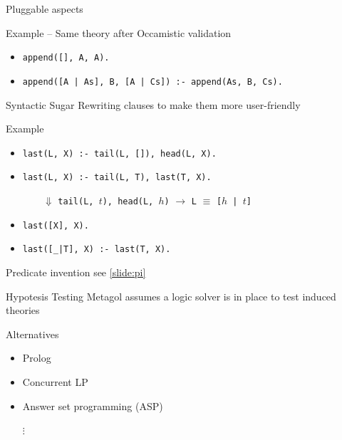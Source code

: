 \documentclass[presentation]{beamer}\mode<presentation>{\usetheme{AMSBolognaFC}}
\begin{document}
\begin{frame}[allowframebreaks]{Pluggable aspects}
    \begin{exampleblock}{Example -- Same theory after Occamistic validation}\scriptsize
        \begin{itemize}
            \item \texttt{append([], A, A).}
            \item \texttt{append([A | As], B, [A | Cs]) :- append(As, B, Cs).}
        \end{itemize}
    \end{exampleblock}

    \framebreak

    \begin{block}{Syntactic Sugar}
        Rewriting clauses to make them more user-friendly
    \end{block}

    \begin{exampleblock}{Example}\scriptsize
        \begin{itemize}
            \item \texttt{last(L, X) :- tail(L, []), head(L, X).}
            \item \texttt{last(L, X) :- tail(L, T), last(T, X).}
            \begin{center}\small
                $\qquad \Downarrow$ {\footnotesize \texttt{tail(L, $t$), head(L, $h$)} $\rightarrow$ \texttt{L} $\equiv$ \texttt{[$h$ | $t$]}}
            \end{center}
            \item \texttt{last([X], X).}
            \item \texttt{last([\_|T], X) :- last(T, X).}
        \end{itemize}
    \end{exampleblock}

    \framebreak

    \begin{block}{Predicate invention}\centering
        see \ref{slide:pi}
    \end{block}

    \framebreak

    \begin{block}{Hypotesis Testing}
        Metagol assumes a logic solver is in place to test induced theories
    \end{block}

    \begin{exampleblock}{Alternatives}
        \begin{itemize}
            \item Prolog
            \item Concurrent LP
            \item Answer set programming (ASP)
            \item[$\vdots$]
        \end{itemize}
    \end{exampleblock}

\end{frame}
\end{document}
